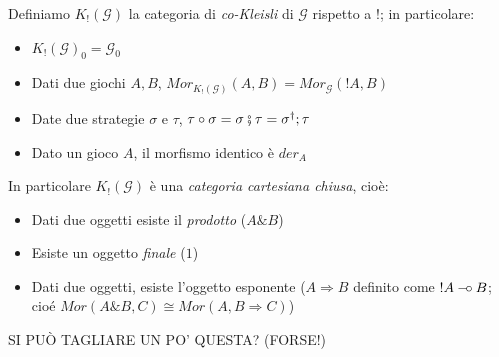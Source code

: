 \documentclass{beamer}
\newcommand{\limp}{\mathbin{{-}\mkern-3.5mu{\circ}}}
\begin{document}
\begin{frame}

	Definiamo $K_!(\mathcal{G})$ la categoria di \emph{co-Kleisli} di $\mathcal{G}$ rispetto a $!$; in particolare:
	\begin{itemize}
		\item $K_!(\mathcal{G})_0 = \mathcal{G}_0$
		\item Dati due giochi $A,B$, $Mor_{K_!(\mathcal{G})}(A,B) = Mor_{\mathcal{G}}(!A,B)$
		\item Date due strategie $\sigma$ e $\tau$, $\tau \circ \sigma = \sigma \fatsemi \tau = \sigma ^\dag ; \tau$
		\item Dato un gioco $A$, il morfismo identico è $der_A$
	\end{itemize}

	In particolare $K_!(\mathcal{G})$ è una \emph{categoria cartesiana chiusa}, cioè:
	\begin{itemize}
		\item Dati due oggetti esiste il \emph{prodotto} ($A\& B$)
		\item Esiste un oggetto \emph{finale} ($1$)
		\item Dati due oggetti, esiste l'oggetto esponente ($A \Rightarrow B$ definito come $!A \limp B$; cioé $Mor(A\& B,C) \cong Mor(A,B\Rightarrow C)$)
	\end{itemize}

	SI PUÒ TAGLIARE UN PO' QUESTA? (FORSE!)

\end{frame}
\end{document}
